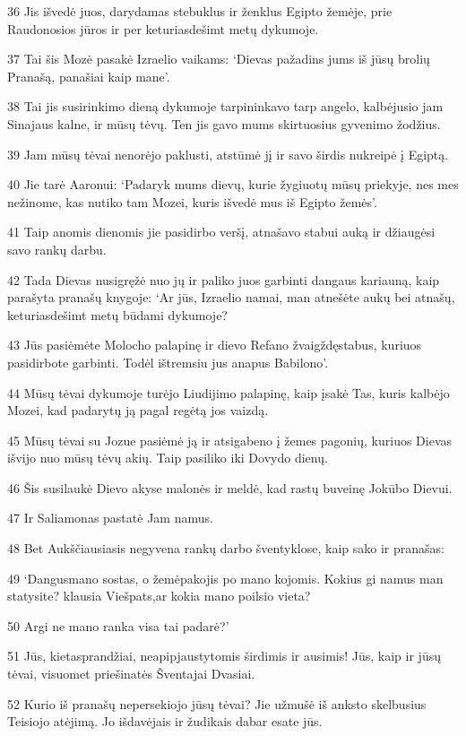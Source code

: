\par 36 Jis išvedė juos, darydamas stebuklus ir ženklus Egipto žemėje, prie Raudonosios jūros ir per keturiasdešimt metų dykumoje. 
\par 37 Tai šis Mozė pasakė Izraelio vaikams: ‘Dievas pažadins jums iš jūsų brolių Pranašą, panašiai kaip mane’. 
\par 38 Tai jis susirinkimo dieną dykumoje tarpininkavo tarp angelo, kalbėjusio jam Sinajaus kalne, ir mūsų tėvų. Ten jis gavo mums skirtuosius gyvenimo žodžius. 
\par 39 Jam mūsų tėvai nenorėjo paklusti, atstūmė jį ir savo širdis nukreipė į Egiptą. 
\par 40 Jie tarė Aaronui: ‘Padaryk mums dievų, kurie žygiuotų mūsų priekyje, nes mes nežinome, kas nutiko tam Mozei, kuris išvedė mus iš Egipto žemės’. 
\par 41 Taip anomis dienomis jie pasidirbo veršį, atnašavo stabui auką ir džiaugėsi savo rankų darbu. 
\par 42 Tada Dievas nusigręžė nuo jų ir paliko juos garbinti dangaus kariauną, kaip parašyta pranašų knygoje: ‘Ar jūs, Izraelio namai, man atnešėte aukų bei atnašų, keturiasdešimt metų būdami dykumoje? 
\par 43 Jūs pasiėmėte Molocho palapinę ir dievo Refano žvaigždę­stabus, kuriuos pasidirbote garbinti. Todėl ištremsiu jus anapus Babilono’. 
\par 44 Mūsų tėvai dykumoje turėjo Liudijimo palapinę, kaip įsakė Tas, kuris kalbėjo Mozei, kad padarytų ją pagal regėtą jos vaizdą. 
\par 45 Mūsų tėvai su Jozue pasiėmė ją ir atsigabeno į žemes pagonių, kuriuos Dievas išvijo nuo mūsų tėvų akių. Taip pasiliko iki Dovydo dienų. 
\par 46 Šis susilaukė Dievo akyse malonės ir meldė, kad rastų buveinę Jokūbo Dievui. 
\par 47 Ir Saliamonas pastatė Jam namus. 
\par 48 Bet Aukščiausiasis negyvena rankų darbo šventyklose, kaip sako ir pranašas: 
\par 49 ‘Dangus­mano sostas, o žemė­pakojis po mano kojomis. Kokius gi namus man statysite?­ klausia Viešpats,­ar kokia mano poilsio vieta? 
\par 50 Argi ne mano ranka visa tai padarė?’ 
\par 51 Jūs, kietasprandžiai, neapipjaustytomis širdimis ir ausimis! Jūs, kaip ir jūsų tėvai, visuomet priešinatės Šventajai Dvasiai. 
\par 52 Kurio iš pranašų nepersekiojo jūsų tėvai? Jie užmušė iš anksto skelbusius Teisiojo atėjimą. Jo išdavėjais ir žudikais dabar esate jūs. 
